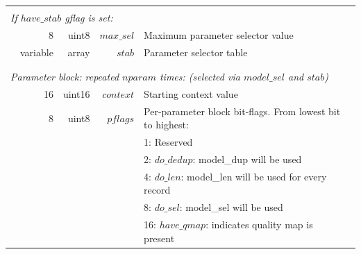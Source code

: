 \documentclass[a4paper]{article}
\begin{document}
\begin{table}[H]
\begin{tabular}{|r|r|r|r|r|p{8cm}|l|l|}
\multicolumn{8}{|l|}{}\\[-0.5em]
\multicolumn{8}{|l|}{\textit{If $have\_stab$ gflag is set:} }                                                                                                                                 \\
\cline{2-7}
                       & \multicolumn{2}{r|}{8}        & uint8          & $max\_sel$                     & \multicolumn{2}{p{8.4cm}|}{Maximum parameter selector value} & \\
                       & \multicolumn{2}{r|}{variable} & array          & $stab$                         & \multicolumn{2}{p{8.4cm}|}{Parameter selector table} & \\
\cline{2-7}
\multicolumn{8}{|l|}{}\\
\hline
\hline
\multicolumn{8}{|l|}{}\\[-0.7em]
\multicolumn{8}{|l|}{\textit{Parameter block: repeated $nparam$ times: (selected via $model\_sel$ and $stab$)}} \\
\cline{2-7}
                       & \multicolumn{2}{r|}{16}        & uint16        & $context$                      & \multicolumn{2}{p{8.4cm}|}{Starting context value} & \\
\cline{2-7}
                       & \multicolumn{2}{r|}{8}        & uint8          & $pflags$                       & \multicolumn{2}{p{8.4cm}|}{Per-parameter block bit-flags. From lowest bit to highest:} & \\
                       & \multicolumn{2}{r|}{}         &                &                                & \multicolumn{2}{p{8.4cm}|}{1: Reserved} & \\
                       & \multicolumn{2}{r|}{}         &                &                                & \multicolumn{2}{p{8.4cm}|}{2: $do\_dedup$: model\_dup will be used} & \\
                       & \multicolumn{2}{r|}{}         &                &                                & \multicolumn{2}{p{8.4cm}|}{4: $do\_len$: model\_len will be used for every record} & \\
                       & \multicolumn{2}{r|}{}         &                &                                & \multicolumn{2}{p{8.4cm}|}{8: $do\_sel$: model\_sel will be used} & \\
                       & \multicolumn{2}{r|}{}         &                &                                & \multicolumn{2}{p{8.4cm}|}{16: $have\_qmap$: indicates quality map is present} & \\

\end{tabular}
\end{table}
\end{document}
